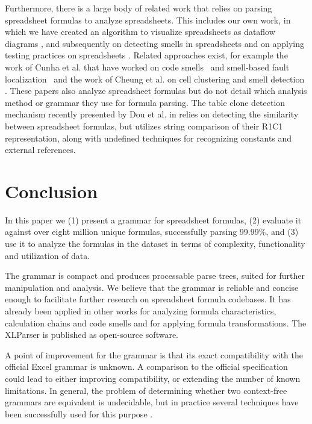 \documentclass[times]{smrauth}
\begin{document}
Furthermore, there is a large body of related work that relies on parsing spreadsheet formulas to analyze spreadsheets. This includes our own work, in which we have created an algorithm to visualize spreadsheets as dataflow diagrams \cite{DBLP:conf/icse/HermansPD11}, and subsequently on detecting smells in spreadsheets \cite{DBLP:conf/icse/HermansPD12} and on applying testing practices on spreadsheets \cite{Expector}. Related approaches exist, for example the work of Cunha et al. that have worked on code smells~\cite{iccsa12} and smell-based fault localization~\cite{conf/icsme/CunhaFMPS14} and the work of Cheung et al. on cell clustering and smell detection \cite{custodes}. These papers also analyze spreadsheet formulas but do not detail which analysis method or grammar they use for formula parsing. The table clone detection mechanism recently presented by Dou et al. in \cite{Dou2016} relies on detecting the similarity between spreadsheet formulas, but utilizes string comparison of their R1C1 representation, along with undefined techniques for recognizing constants and external references.

\section{Conclusion}
\label{section:conclusion}
In this paper we (1) present a grammar for spreadsheet formulas, (2) evaluate it against over eight million unique formulas, successfully parsing 99.99\%, and (3) use it to analyze the formulas in the dataset in terms of complexity, functionality and utilization of data.

The grammar is compact and produces processable parse trees, suited for further manipulation and analysis. We believe that the grammar is reliable and concise enough to facilitate further research on spreadsheet formula codebases. It has already been applied in other works for analyzing formula characteristics, calculation chains and code smells and for applying formula transformations. The XLParser is published as open-source software.

A point of improvement for the grammar is that its exact compatibility with the official Excel grammar is unknown.
A comparison to the official specification could lead to either improving compatibility, or extending the number of known limitations.
In general, the problem of determining whether two context-free grammars are equivalent is undecidable, but in practice several techniques have been successfully used for this purpose \cite{lammel2009introduction,fischer2012comparison}.
\end{document}
